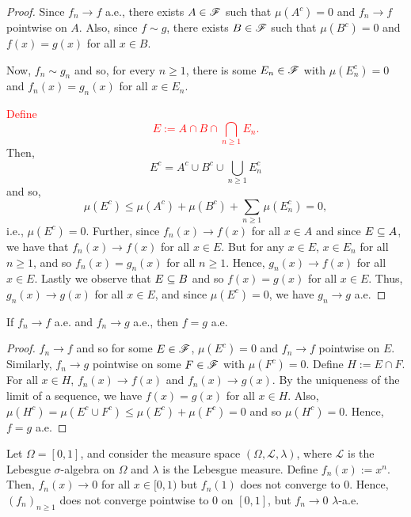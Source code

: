 \begin{proof}
    Since $f_n \to f$ a.e., there exists $A \in \mathscr{F}$ such that $\mu(A^c) = 0$ and $f_n \to f$ pointwise on $A$. Also, since $f \sim g$, there exists $B \in \mathscr{F}$ such that $\mu(B^c) = 0$ and $f(x) = g(x)$ for all $x \in B$.

    Now, $f_n \sim g_n$ and so, for every $n \geq 1$, there is some $E_n \in \mathscr{F}$ with $\mu(E_n^c) = 0$ and $f_n(x) = g_n(x)$ for all $x \in E_n$. 

    \textcolor{red}{Define $$E := A \cap B \cap \bigcap_{n \geq 1} E_n.$$}
    Then, 
    $$E^c = A^c \cup B^c \cup \bigcup_{n \geq 1} E_n^c$$
    and so,
    $$\mu(E^c) \leq \mu(A^c) + \mu(B^c) + \sum_{n \geq 1} \mu(E_n^c) = 0,$$
    i.e., $\mu(E^c) = 0$. Further, since $f_n(x) \to f(x)$ for all $x \in A$ and since $E \subseteq A$, we have that $f_n(x) \to f(x)$ for all $x \in E$. But for any $x \in E$, $x \in E_n$ for all $n \geq 1$, and so $f_n(x) = g_n(x)$ for all $n \geq 1$. Hence, $g_n(x) \to f(x)$ for all $x \in E$. Lastly we observe that $E \subseteq B$ and so $f(x) = g(x)$ for all $x \in E$. Thus, $g_n(x) \to g(x)$ for all $x \in E$, and since $\mu(E^c) = 0$, we have $g_n \to g$ a.e.
\end{proof}

\begin{lemma}
    If $f_n \to f$ a.e. and $f_n \to g$ a.e., then $f = g$ a.e.
\end{lemma}

\begin{proof}
    $f_n \to f$ and so for some $E \in \mathscr{F}$, $\mu(E^c) = 0$ and $f_n \to f$ pointwise on $E$. Similarly, $f_n \to g$ pointwise on some $F \in \mathscr{F}$ with $\mu(F^c) = 0$. Define $H := E \cap F$. For all $x \in H$, $f_n(x) \to f(x)$ and $f_n(x) \to g(x)$. By the uniqueness of the limit of a sequence, we have $f(x) = g(x)$ for all $x \in H$. Also, $\mu(H^c) = \mu(E^c \cup F^c) \leq \mu(E^c) + \mu(F^c) = 0$ and so $\mu(H^c) = 0$. Hence, $f = g$ a.e.
\end{proof}

\begin{example}
    Let $\Omega = [0, 1]$, and consider the measure space $(\Omega, \mathscr{L}, \lambda)$, where $\mathscr{L}$ is the Lebesgue $\sigma$-algebra on $\Omega$ and $\lambda$ is the Lebesgue measure. Define $f_n(x) := x^n$. Then, $f_n(x) \to 0$ for all $x \in [0, 1)$ but $f_n(1)$ does not converge to $0$. Hence, $(f_n)_{n \geq 1}$ does not converge pointwise to 0 on $[0, 1]$, but $f_n \to 0$ $\lambda$-a.e.
\end{example}


